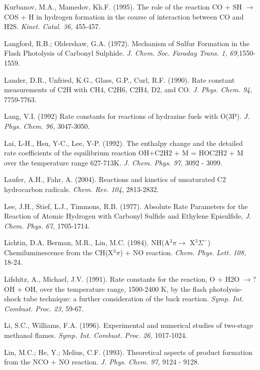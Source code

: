 \documentclass[12pt,landscape]{article}
\newcounter{reaction}
\newcounter{photo}
\begin{document}
Kurbanov, M.A., Mamedov, Kh.F.  (1995). The role of the reaction CO + SH $\rightarrow$ COS + H in hydrogen formation in the course of interaction between CO and H2S. {\em Kinet. Catal.  36,} 455-457.

Langford, R.B.; Oldershaw, G.A. (1972). Mechanism of Sulfur Formation in the Flash Photolysis of Carbonyl Sulphide. {\em J. Chem. Soc. Faraday Trans. 1, 69,}1550-1559.

Lander, D.R., Unfried, K.G., Glass, G.P., Curl, R.F. (1990). Rate constant measurements of C2H with CH4, C2H6, C2H4, D2, and CO.  {\em J. Phys. Chem. 94,} 7759-7763. 

Lang, V.I. (1992)  Rate constants for reactions of hydrazine fuels with O(3P).  {\em J. Phys. Chem. 96,} 3047-3050.

Lai, L-H., Hsu, Y-C., Lee, Y-P. (1992). The enthalpy change and the detailed rate coefficients of the equilibrium reaction OH+C2H2 + M = HOC2H2 + M over the temperature range 627-713K.  {\em J. Chem. Phys. 97,} 3092 - 3099.

Laufer, A.H., Fahr, A. (2004). Reactions and kinetics of unsaturated C2 hydrocarbon radicals. {\em Chem. Rev. 104,} 2813-2832.

Lee, J.H., Stief, L.J., Timmons, R.B. (1977). Absolute Rate Parameters for the Reaction of Atomic Hydrogen with Carbonyl Sulfide and Ethylene Episulfide,  {\em J. Chem. Phys. 67,} 1705-1714.

Lichtin, D.A. Berman, M.R., Lin, M.C. (1984). NH(A$^3\pi \rightarrow$ X$^3\Sigma^-$) Chemiluminescence from the CH(X$^3\pi$) + NO reaction.  {\em Chem. Phys. Lett. 108,} 18-24.

Lifshitz, A., Michael, J.V. (1991). Rate constants for the reaction, O + H2O $\rightarrow$? OH + OH, over the temperature range, 1500-2400 K, by the flash photolysis-shock tube technique: a further consideration of the back reaction. {\em Symp. Int. Combust. Proc. 23,}  59-67.

Li, S.C., Williams, F.A. (1996). Experimental and numerical studies of two-stage methanol flames.  {\em Symp. Int. Combust. Proc. 26,} 1017-1024.

Lin, M.C.; He, Y.; Melius, C.F. (1993). Theoretical aspects of product formation from the NCO + NO reaction.  {\em J. Phys. Chem. 97,}  9124 - 9128.
\end{document}
